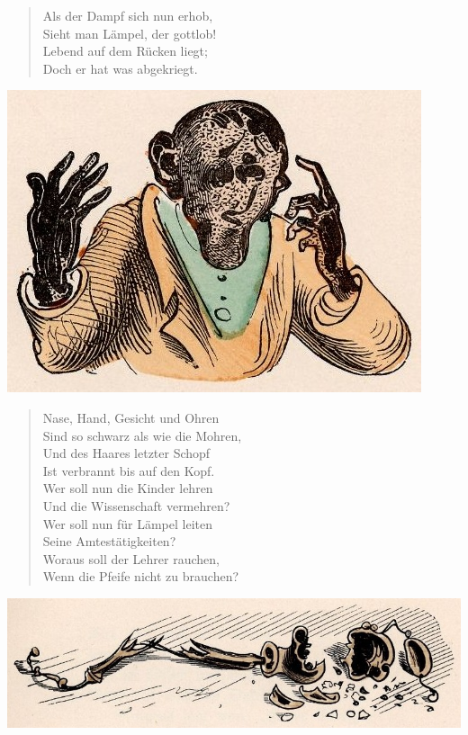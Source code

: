 \documentclass[a4paper,12pt]{article}
\begin{document}
\begin{verse}
Als der Dampf sich nun erhob,\\{}
Sieht man Lämpel, der gottlob!\\{}
Lebend auf dem Rücken liegt;\\{}
Doch er hat was abgekriegt.
\end{verse}



\begin{center}\includegraphics[scale=.7, alt={schwarz wie ein Mohr}]{images/4-10.jpg}\end{center}



\begin{verse}
Nase, Hand, Gesicht und Ohren\\{}
Sind so schwarz als wie die Mohren,\\{}
Und des Haares letzter Schopf\\{}
Ist verbrannt bis auf den Kopf.\\{}
Wer soll nun die Kinder lehren\\{}
Und die Wissenschaft vermehren?\\{}
Wer soll nun für Lämpel leiten\\{}
Seine Amtestätigkeiten?\\{}
Woraus soll der Lehrer rauchen,\\{}
Wenn die Pfeife nicht zu brauchen?
\end{verse}



\begin{center}\includegraphics[scale=.7, alt={die Pfeife hat ihr Teil}]{images/4-11.jpg}\end{center}
\end{document}
